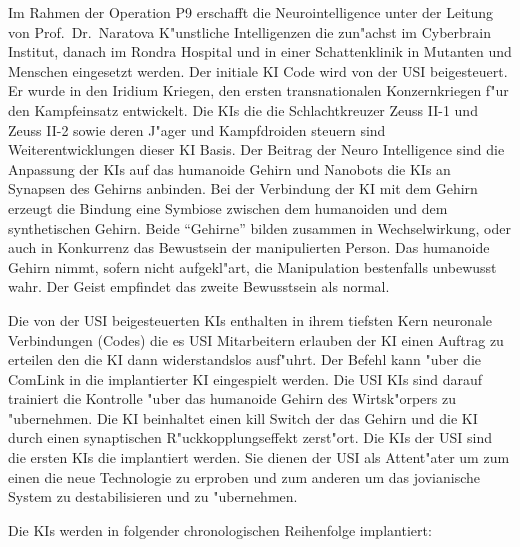 
Im Rahmen der Operation P9 erschafft die Neurointelligence unter der Leitung von Prof.~Dr.~Naratova K"unstliche Intelligenzen die zun"achst im Cyberbrain Institut, danach im Rondra Hospital und in einer Schattenklinik in Mutanten und Menschen eingesetzt werden. Der initiale KI Code wird von der USI beigesteuert. Er wurde in den Iridium Kriegen, den ersten transnationalen Konzernkriegen f"ur den Kampfeinsatz entwickelt. Die KIs die die Schlachtkreuzer Zeuss II-1 und Zeuss II-2 sowie deren J"ager und Kampfdroiden steuern sind Weiterentwicklungen dieser KI Basis. Der Beitrag der Neuro Intelligence sind die Anpassung der KIs auf das humanoide Gehirn und Nanobots die KIs an Synapsen  des Gehirns anbinden. Bei der Verbindung der KI mit dem Gehirn erzeugt die Bindung eine Symbiose zwischen dem humanoiden und dem synthetischen Gehirn. Beide "`Gehirne"' bilden zusammen in Wechselwirkung, oder auch in Konkurrenz das Bewustsein der manipulierten Person. Das humanoide Gehirn nimmt, sofern nicht aufgekl"art, die Manipulation bestenfalls unbewusst wahr. Der Geist empfindet das zweite Bewusstsein als normal.

Die von der USI beigesteuerten KIs enthalten in ihrem tiefsten Kern neuronale Verbindungen (Codes) die es USI Mitarbeitern erlauben der KI einen Auftrag zu erteilen den die KI dann widerstandslos ausf"uhrt. Der Befehl kann "uber die ComLink in die implantierter KI eingespielt werden. Die USI KIs sind darauf trainiert die Kontrolle "uber das humanoide Gehirn des Wirtsk"orpers zu "ubernehmen. Die KI beinhaltet einen kill Switch der das Gehirn und die KI durch einen synaptischen R"uckkopplungseffekt zerst"ort. Die KIs der USI sind die ersten KIs die implantiert werden. Sie dienen der USI als Attent"ater um zum einen die neue Technologie zu erproben und zum anderen um das jovianische System zu destabilisieren und zu "ubernehmen. 

Die KIs werden in folgender chronologischen Reihenfolge implantiert:

